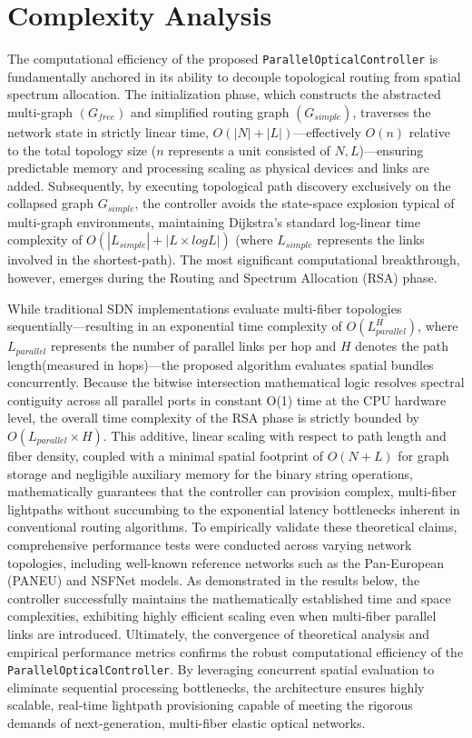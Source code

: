 \section{Complexity Analysis}
The computational efficiency of the proposed \texttt{ParallelOpticalController} is fundamentally anchored in its ability to decouple topological routing from spatial spectrum allocation. The initialization phase, which constructs the abstracted multi-graph $(G_{free})$ and simplified routing graph $(G_{simple})$, traverses the network state in strictly linear time, $O(|N|+|L|)$—effectively $O(n)$ relative to the total topology size ($n$ represents a unit consisted of $N,L$)—ensuring predictable memory and processing scaling as physical devices and links are added. Subsequently, by executing topological path discovery exclusively on the collapsed graph $G_{simple}$, the controller avoids the state-space explosion typical of multi-graph environments, maintaining Dijkstra's standard log-linear time complexity of $O(|L_{simple}|+|L \times logL|)$ (where $L_{simple}$ represents the links involved in the shortest-path). The most significant computational breakthrough, however, emerges during the Routing and Spectrum Allocation (RSA) phase.

While traditional SDN implementations evaluate multi-fiber topologies sequentially—resulting in an exponential time complexity of $O(L_{parallel}^H)$, where $L_{parallel}$ represents the number of parallel links per hop and $H$ denotes the path length(measured in hops)—the proposed algorithm evaluates spatial bundles concurrently. Because the bitwise intersection mathematical logic resolves spectral contiguity across all parallel ports in constant O(1) time at the CPU hardware level, the overall time complexity of the RSA phase is strictly bounded by $O(L_{parallel}\times H)$. This additive, linear scaling with respect to path length and fiber density, coupled with a minimal spatial footprint of $O(N+L)$ for graph storage and negligible auxiliary memory for the binary string operations, mathematically guarantees that the controller can provision complex, multi-fiber lightpaths without succumbing to the exponential latency bottlenecks inherent in conventional routing algorithms. To empirically validate these theoretical claims, comprehensive performance tests were conducted across varying network topologies, including well-known reference networks such as the Pan-European (PANEU) and NSFNet models. As demonstrated in the results below, the controller successfully maintains the mathematically established time and space complexities, exhibiting highly efficient scaling even when multi-fiber parallel links are introduced. Ultimately, the convergence of theoretical analysis and empirical performance metrics confirms the robust computational efficiency of the \texttt{ParallelOpticalController}. By leveraging concurrent spatial evaluation to eliminate sequential processing bottlenecks, the architecture ensures highly scalable, real-time lightpath provisioning capable of meeting the rigorous demands of next-generation, multi-fiber elastic optical networks.